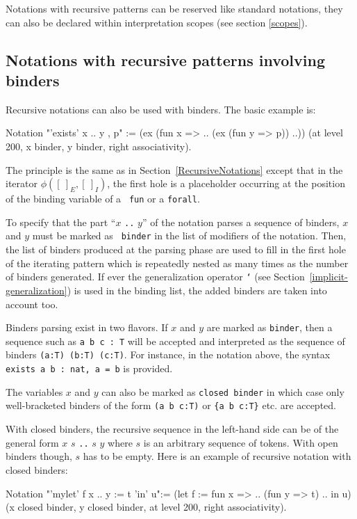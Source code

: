 Notations with recursive patterns can be reserved like standard
notations, they can also be declared within interpretation scopes (see
section \ref{scopes}).

\subsection{Notations with recursive patterns involving binders}

Recursive notations can also be used with binders. The basic example is:

\begin{coq_example*}
Notation "'exists' x .. y , p" := (ex (fun x => .. (ex (fun y => p)) ..))
  (at level 200, x binder, y binder, right associativity).
\end{coq_example*}

The principle is the same as in Section~\ref{RecursiveNotations}
except that in the iterator $\phi([~]_E,[~]_I)$, the first hole is a
placeholder occurring at the position of the binding variable of a {\tt
  fun} or a {\tt forall}.

To specify that the part ``$x$ {\tt ..} $y$'' of the notation
parses a sequence of binders, $x$ and $y$ must be marked as {\tt
  binder} in the list of modifiers of the notation.  Then, the list of
binders produced at the parsing phase are used to fill in the first
hole of the iterating pattern which is repeatedly nested as many times
as the number of binders generated. If ever the generalization
operator {\tt `} (see Section~\ref{implicit-generalization}) is used
in the binding list, the added binders are taken into account too.

Binders parsing exist in two flavors. If $x$ and $y$ are marked as
{\tt binder}, then a sequence such as {\tt a b c : T} will be accepted
and interpreted as the sequence of binders {\tt (a:T) (b:T)
  (c:T)}. For instance, in the notation above, the syntax {\tt exists
  a b : nat, a = b} is provided.

The variables $x$ and $y$ can also be marked as {\tt closed binder} in
which case only well-bracketed binders of the form {\tt (a b c:T)} or
{\tt \{a b c:T\}} etc. are accepted.

With closed binders, the recursive sequence in the left-hand side can
be of the general form $x$ $s$ {\tt ..} $s$ $y$ where $s$ is an
arbitrary sequence of tokens. With open binders though, $s$ has to be
empty. Here is an example of recursive notation with closed binders:

\begin{coq_example*}
Notation "'mylet' f x .. y :=  t 'in' u":=
  (let f := fun x => .. (fun y => t) .. in u)
  (x closed binder, y closed binder, at level 200, right associativity).
\end{coq_example*}

